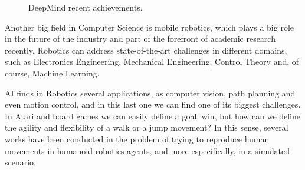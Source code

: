 \begin{figure}[ht]
	 \caption{DeepMind recent achievements.}
	\label{fig:deepmind_examples}
\end{figure}



Another big field in Computer Science is mobile robotics, which plays a big role in the future of the industry and part of the forefront of academic research recently. Robotics can address state-of-the-art challenges in different domains, such as Electronics Engineering, Mechanical Engineering, Control Theory and, of course, Machine Learning.

AI finds in Robotics several applications, as computer vision, path planning and even motion control, and in this last one we can find one of its biggest challenges. In Atari and board games we can easily define a goal, win, but how can we define the agility and flexibility of a walk or a jump movement? In this sense, several works have been conducted in the problem of trying to reproduce human movements in humanoid robotics agents, and more especifically, in a simulated scenario.

